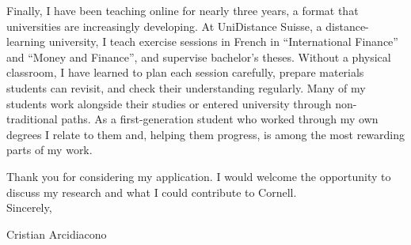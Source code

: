 \documentclass[11pt]{article}
\begin{document}
Finally, I have been teaching online for nearly three years, a format that universities are increasingly developing. At UniDistance Suisse, a distance-learning university, I teach exercise sessions in French in ``International Finance'' and ``Money and Finance'', and supervise bachelor's theses. Without a physical classroom, I have learned to plan each session carefully, prepare materials students can revisit, and check their understanding regularly. Many of my students work alongside their studies or entered university through non-traditional paths. As a first-generation student who worked through my own degrees I relate to them and, helping them progress, is among the most rewarding parts of my work. %

Thank you for considering my application. I would welcome the opportunity to discuss my research and what I could contribute to Cornell. \\

Sincerely,

Cristian Arcidiacono
\end{document}

